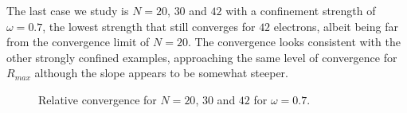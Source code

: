 The last case we study is $N=20$, $30$ and $42$ with a confinement strength of $\omega = 0.7$, the lowest strength that still converges for $42$ electrons, albeit being far from the convergence limit of $N=20$.
The convergence looks consistent with the other strongly confined examples, approaching the same level of convergence for $R_{max}$ although the slope appears to be somewhat steeper.
\begin{figure}
\begin{center}
\caption{Relative convergence for $N=20$, $30$ and $42$ for $\omega =0.7$.}
\end{center}
\end{figure}



